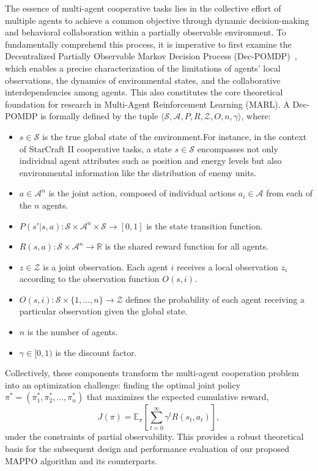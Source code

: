 The essence of multi-agent cooperative tasks lies in the collective effort of multiple agents to achieve a common objective through dynamic decision-making and behavioral collaboration within a partially observable environment. To fundamentally comprehend this process, it is imperative to first examine the Decentralized Partially Observable Markov Decision Process (Dec-POMDP)~\cite{oliehoekConciseIntroductionDecentralized2016}, which enables a precise characterization of the limitations of agents' local observations, the dynamics of environmental states, and the collaborative interdependencies among agents. This also constitutes the core theoretical foundation for research in Multi-Agent Reinforcement Learning (MARL).
A Dec-POMDP is formally defined by the tuple  $\langle \mathcal{S}, \mathcal{A}, P, R, \mathcal{Z}, O, n, \gamma \rangle$, where:
\begin{itemize}
    \item $s \in \mathcal{S}$ is the true global state of the environment.For instance, in the context of StarCraft II cooperative tasks, a state $s \in \mathcal{S}$ encompasses not only individual agent attributes such as position and energy levels but also environmental information like the distribution of enemy units. 
    \item $a \in \mathcal{A}^n$ is the joint action, composed of individual actions $a_i \in \mathcal{A}$ from each of the $n$ agents.
    \item $P(s'|s, a): \mathcal{S} \times \mathcal{A}^n \times \mathcal{S} \to [0, 1]$ is the state transition function.
    \item $R(s, a): \mathcal{S} \times \mathcal{A}^n \to \mathbb{R}$ is the shared reward function for all agents.
    \item $z \in \mathcal{Z}$ is a joint observation. Each agent $i$ receives a local observation $z_i$ according to the observation function $O(s, i)$.
    \item $O(s, i): \mathcal{S} \times \{1, \ldots, n\} \to \mathcal{Z}$ defines the probability of each agent receiving a particular observation given the global state.
    \item $n$ is the number of agents.
    \item $\gamma \in [0, 1)$ is the discount factor.
\end{itemize}
Collectively, these components transform the multi-agent cooperation problem into an optimization challenge: finding the optimal joint policy $\pi^* = (\pi_1^*, \pi_2^*, \ldots , \pi_n^*)$ that maximizes the expected cumulative reward,
\begin{equation} 
     J (\pi) = \mathbb{E}_{\pi} \left[ \sum_{t=0}^{\infty} \gamma^t R (s_t, a_t) \right],
\end{equation}
under the constraints of partial observability. This provides a robust theoretical basis for the subsequent design and performance evaluation of our proposed MAPPO algorithm and its counterparts.

